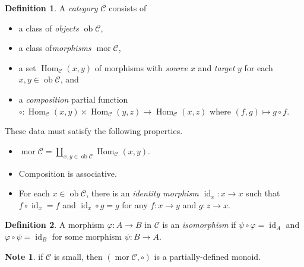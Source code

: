 \documentclass[10pt,letterpaper,cm]{nupset}
\theoremstyle{definition}
\newtheorem*{definition}{Definition}
\newtheorem{note}{Note}
\newcommand{\1}{\mathbf{1}}
\renewcommand{\c}{\mathscr{C}}
\newcommand{\0}{\vec 0}
\DeclareMathOperator{\id}{id}
\DeclareMathOperator{\mor}{mor}
\DeclareMathOperator{\ob}{ob}
\DeclareMathOperator{\Hom}{Hom}
\begin{document}
\begin{definition} 
A \textit{category $\c$} consists of
\begin{itemize}
\item a class of \textit{objects $\ob{\c}$},
\item a class of\textit{morphisms $\mor{\c}$},
\item a set $\Hom_{\c}(x,y)$ of morphisms with \textit{source} $x$ and \textit{target} $y$ for each $x,y \in \ob{\c}$, and
\item a \textit{composition} partial function $\circ : \Hom_{\c}(x,y) \times \Hom_{\c}(y,z) \to \Hom_{\c}(x,z)$ where $(f,g) \mapsto g \circ f$.
\end{itemize}
These data must satisfy the following properties.
\begin{itemize}
\item $\mor{\c} = \coprod_{x,y\in \ob{\c}} \Hom_{\c}(x,y)$.
\item Composition is associative.
\item For each $x\in \ob{\c}$, there is an \textit{identity morphism $\id_x: x \to x$} such that $f \circ \id_x = f$ and $\id_x \circ g = g$ for any $f: x \to y$ and $g: z \to x$.
\end{itemize}
\end{definition}

\begin{definition}
A morphism $\varphi : A \to B$ in $\c$ is an \textit{isomorphism} if $\psi \circ \varphi = \id_A$ and $\varphi \circ \psi = \id_B$ for some morphism $\psi : B \to A$.
\end{definition}

\begin{note}
if $\c$ is small, then $(\mor \c, \circ)$ is a partially-defined monoid.
\end{note}
\end{document}
